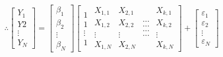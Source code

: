 \documentclass[11pt, english]{article}
\begin{document}
	$$\therefore\begin{bmatrix}Y_1\\Y2\\\vdots\\Y_N\end{bmatrix}=\begin{bmatrix}\beta_1\\\beta_2\\\vdots\\\beta_N\end{bmatrix}\left[\begin{matrix}1\\1\\\vdots\\1\end{matrix}\begin{matrix}X_{1,1}\\X_{1,2}\\\vdots\\X_{1,N}\end{matrix}\begin{matrix}X_{2,1}\\X_{2,2}\\\vdots\\X_{2,N}\end{matrix}\begin{matrix}\hdots\\\hdots\\\hdots\\\hdots\end{matrix}\begin{matrix}X_{k,1}\\X_{k,2}\\\vdots\\X_{k,N}\end{matrix}\right]+\begin{bmatrix}\varepsilon_1\\\varepsilon_2\\\vdots\\\varepsilon_N\end{bmatrix}$$
\end{document}
